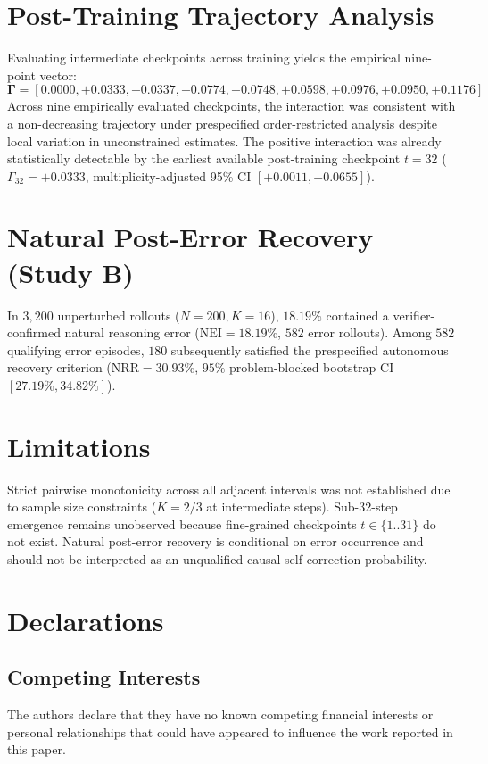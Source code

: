 \documentclass[11pt,3p,review]{elsarticle}
\begin{document}
\section{Post-Training Trajectory Analysis}
Evaluating intermediate checkpoints across training yields the empirical nine-point vector:
\begin{equation}
\mathbf{\Gamma} = [0.0000, +0.0333, +0.0337, +0.0774, +0.0748, +0.0598, +0.0976, +0.0950, +0.1176]
\end{equation}
Across nine empirically evaluated checkpoints, the interaction was consistent with a non-decreasing trajectory under prespecified order-restricted analysis despite local variation in unconstrained estimates. The positive interaction was already statistically detectable by the earliest available post-training checkpoint $t=32$ ($\Gamma_{32} = +0.0333$, multiplicity-adjusted 95\% CI $[+0.0011, +0.0655]$).

\section{Natural Post-Error Recovery (Study B)}
In $3,200$ unperturbed rollouts ($N=200, K=16$), $18.19\%$ contained a verifier-confirmed natural reasoning error ($\text{NEI} = 18.19\%$, $582$ error rollouts). Among $582$ qualifying error episodes, $180$ subsequently satisfied the prespecified autonomous recovery criterion ($\text{NRR} = \mathbf{30.93\%}$, $95\%$ problem-blocked bootstrap CI $[27.19\%, 34.82\%]$).

\section{Limitations}
Strict pairwise monotonicity across all adjacent intervals was not established due to sample size constraints ($K=2/3$ at intermediate steps). Sub-32-step emergence remains unobserved because fine-grained checkpoints $t \in \{1..31\}$ do not exist. Natural post-error recovery is conditional on error occurrence and should not be interpreted as an unqualified causal self-correction probability.

\section{Declarations}
\subsection{Competing Interests}
The authors declare that they have no known competing financial interests or personal relationships that could have appeared to influence the work reported in this paper.
\end{document}
